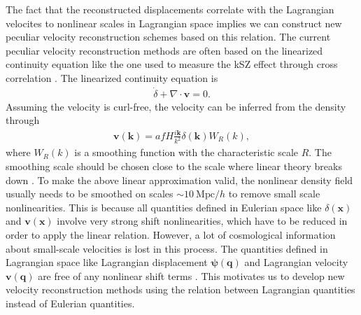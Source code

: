 \documentclass[aps,prx,twocolumn,superscriptaddress,groupedaddress,nofootinbib,amsfont]{revtex4}  %
\newcommand{\mr}{\mathrm}
\newcommand{\bea}{\begin{eqnarray}}
\newcommand{\eea}{\end{eqnarray}}
\newcommand{\bmp}{\bm{\psi}}
\newcommand{\bmv}{\bm{v}}
\newcommand{\bmk}{\bm{k}}
\newcommand{\bmx}{\bm{x}}
\newcommand{\bmq}{\bm{q}}
\begin{document}
The fact that the reconstructed displacements correlate with the Lagrangian 
velocites to nonlinear scales in Lagrangian space implies we can construct
new peculiar velocity reconstruction schemes based on this relation.
The current peculiar velocity reconstruction methods are often based on the 
linearized continuity equation like the one used to measure the kSZ effect 
through cross correlation \cite{2016PVR}. 
The linearized continuity equation is 
\bea
\dot{\delta}+\nabla\cdot\bmv=0.
\eea
Assuming the velocity is curl-free, the velocity can be inferred from the 
density through
\bea
\bmv(\bmk)=afH\frac{i\bmk}{k^2}\delta(\bmk)W_R(k),
\eea
where $W_R(k)$ is a smoothing function with the characteristic scale $R$.
The smoothing scale should be chosen close to the scale where linear theory 
breaks down \cite{2015marcel,2015BAOsm,2016Seo}. 
To make the above linear approximation valid, the nonlinear density field 
usually needs to be smoothed on scales $\sim10\ \mr{Mpc}/h$ to remove small
scale nonlinearities. This is because all quantities defined in Eulerian space
like $\delta(\bmx)$ and $\bmv(\bmx)$ involve very strong shift nonlinearities,
which have to be reduced in order to apply the linear relation. 
However, a lot of cosmological information about small-scale velocities is lost 
in this process. The quantities defined in Lagrangian space like Lagrangian 
displacement $\bmp(\bmq)$ and Lagrangian velocity $\bmv(\bmq)$ are free of any
nonlinear shift terms \cite{2016BSZ}.
This motivates us to develop new velocity reconstruction methods using the 
relation between Lagrangian quantities instead of Eulerian quantities.
\end{document}
